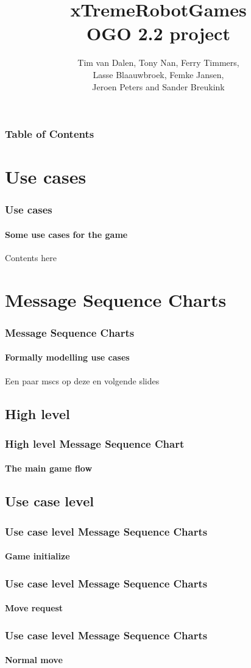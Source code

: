 \documentclass{beamer}
\title{xTremeRobotGames\\\small OGO 2.2 project}
\author{Tim van Dalen, Tony Nan, Ferry Timmers,\\ 
                Lasse Blaauwbroek, Femke Jansen,\\
                Jeroen Peters and Sander Breukink\\}
\institute[TU/e]{}
\begin{document}
	\frame{\titlepage}
	
	\begin{frame}
	    \frametitle{Table of Contents}
    		\tableofcontents
  	\end{frame}

	\section{Use cases}
	\begin{frame}
		\frametitle{Use cases}
		\framesubtitle{Some use cases for the game}
		Contents here
	\end{frame}

	\section{Message Sequence Charts}
	\begin{frame}
		\frametitle{Message Sequence Charts}
		\framesubtitle{Formally modelling use cases}
		Een paar mscs op deze en volgende slides
	\end{frame}
	
	\subsection{High level}
	\begin{frame}
		\frametitle{High level Message Sequence Chart}
		\framesubtitle{The main game flow}
		
	\end{frame}
	\subsection{Use case level}
	\begin{frame}
		\frametitle{Use case level Message Sequence Charts}
		\framesubtitle{Game initialize}
		\scalebox{0.6}{
			
		}
		
	\end{frame}

	\begin{frame}
		\frametitle{Use case level Message Sequence Charts}
		\framesubtitle{Move request}
		\scalebox{0.9}{
			
		}
		
	\end{frame}
	\begin{frame}
		\frametitle{Use case level Message Sequence Charts}
		\framesubtitle{Normal move}
		\scalebox{0.8}{
			
		}
		
	\end{frame}
\end{document}
